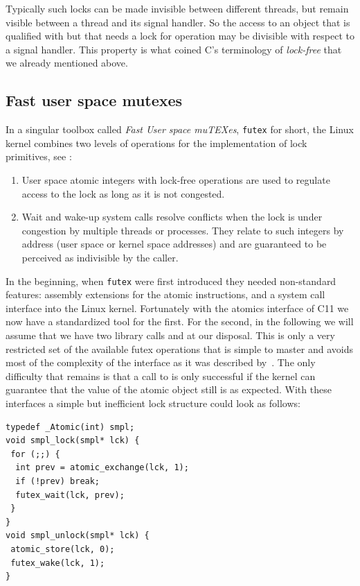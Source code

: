 Typically such locks can be made invisible between different
threads, but remain visible between a thread and its signal
handler. So the access to an object that is qualified with
 but that needs a lock for operation may be divisible with
respect to a signal handler. This property is what coined C's
terminology of \emph{lock-free} that we already mentioned above.

\subsection{Fast user space mutexes}
\label{sec-2-3}

In a singular toolbox called \emph{Fast User space muTEXes}, \texttt{futex} for
short, the Linux kernel combines two levels of operations for the
implementation of lock primitives, see
\cite{Hutton02fuss,hart09}:
\begin{enumerate}
\item User space atomic integers with lock-free operations are used to
regulate access to the lock as long as it is not congested.\itemadjust

\item Wait and wake-up system calls resolve conflicts when the lock is
under congestion by multiple threads or processes. They relate
to such integers by address (user space or kernel space
addresses) and are guaranteed to be perceived as indivisible by
the caller.\itemadjust
\end{enumerate}

In the beginning, when \texttt{futex} were first introduced they needed
non-standard features: assembly extensions for the atomic
instructions, and a system call interface into the Linux
kernel. Fortunately with the atomics interface of C11 we now have
a standardized tool for the first. For the second, in the
following we will assume that we have two library calls
 and  at our disposal.
%
This is only a very restricted set of the available futex operations that
is simple to master and avoids most of the complexity of the interface as
it was described by~\cite{drepper11:futex}. The only difficulty that
remains is that a call to  is only successful if the
kernel can guarantee that the value of the atomic object still is as
expected.
%
With these interfaces a simple but
inefficient lock structure  could look as follows:

\lstset{language=C11,label= ,caption= ,numbers=none}
\begin{lstlisting}
typedef _Atomic(int) smpl;
void smpl_lock(smpl* lck) {
 for (;;) {
  int prev = atomic_exchange(lck, 1);
  if (!prev) break;
  futex_wait(lck, prev);
 }
}
void smpl_unlock(smpl* lck) {
 atomic_store(lck, 0);
 futex_wake(lck, 1);
}
\end{lstlisting}

